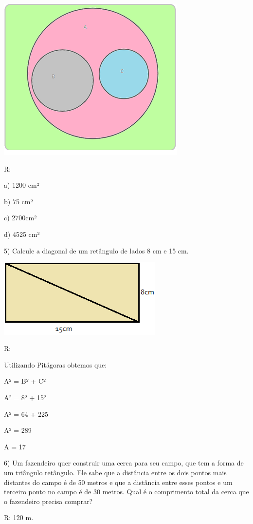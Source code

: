 \includegraphics[width=3.70833in,height=3.22917in]{./imgSAEB_6_MAT/media/image54.png}

R:

a) 1200 cm²

b) 75 cm²

c) 2700cm²

d) 4525 cm²

5) Calcule a diagonal de um retângulo de lados 8 cm e 15 cm.

\includegraphics[width=3.24444in,height=1.54653in]{./imgSAEB_6_MAT/media/image55.png}

R:

Utilizando Pitágoras obtemos que:

A² = B² + C²

A² = 8² + 15²

A² = 64 + 225

A² = 289

A = 17

6) Um fazendeiro quer construir uma cerca para seu campo, que tem a
forma de um triângulo retângulo. Ele sabe que a distância entre os dois
pontos mais distantes do campo é de 50 metros e que a distância entre
esses pontos e um terceiro ponto no campo é de 30 metros. Qual é o
comprimento total da cerca que o fazendeiro precisa comprar?

R: 120 m.

